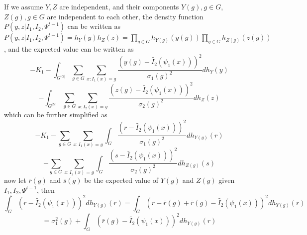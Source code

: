 \documentclass[11pt]{article}
\begin{document}
If we assume $Y, Z$ are independent, and their components $Y(g), g\in G$, $Z(g), g\in G$ are independent to each other, the density function $P(y,z| I_{1}, I_{2}, \Psi^{t-1})$ can be written as $P(y,z| I_{1}, I_{2}, \Psi^{t-1}) = h_{Y}(y)h_{Z}(z) = 
\prod_{g\in G}h_{Y(g)}(y(g)) \prod_{g\in G}h_{Z(g)}(z(g))$, and the expected value can be written as 
\begin{equation}
-K_{1}-\int_{G^{|G|}}\sum_{g\in G} \sum_{x : I_{1}(x) = g} \frac{\left(y(g) - \tilde{I_{2}}(\psi_{1}(x))\right)^{2}}{\sigma_{1}(g)^{2}}d h_{Y}(y) 
\end{equation}
\begin{equation}
-\int_{G^{|G|}}\sum_{g\in G} \sum_{x : I_{2}(x) = g} \frac{\left(z(g) - \tilde{I_{2}}(\psi_{1}(x))\right)^{2}}{\sigma_{2}(g)^{2}}d h_{Z}(z) 
\end{equation}
which can be further simplified as
\begin{equation}
-K_{1}-\sum_{g\in G} \sum_{x : I_{1}(x) = g} \int_{G}\frac{\left(r - \tilde{I_{2}}(\psi_{1}(x))\right)^{2}}{\sigma_{1}(g)^{2}}d h_{Y(g)}(r) 
\end{equation}
\begin{equation}
-\sum_{g\in G} \sum_{x : I_{2}(x) = g} \int_{G}\frac{\left(s - \tilde{I_{2}}(\psi_{1}(x))\right)^{2}}{\sigma_{2}(g)^{2}}d h_{Z(g)}(s) 
\end{equation}
now let $\bar{r}(g)$ and $\bar{s}(g)$ be the expected value of $Y(g)$ and $Z(g)$ given $I_{1}, I_{2}, \Psi^{t-1}$, then 
\begin{equation}
\int_{G}\left(r - \tilde{I_{2}}(\psi_{1}(x))\right)^{2}d h_{Y(g)}(r) = \int_{G}\left(r - \bar{r}(g) + \bar{r}(g) - \tilde{I_{2}}(\psi_{1}(x))\right)^{2}d h_{Y(g)}(r)
\end{equation}
\begin{equation}
=\sigma^{2}_{1}(g) + \int_{G}\left(\bar{r}(g) - \tilde{I_{2}}(\psi_{1}(x))\right)^{2}d h_{Y(g)}(r)
\end{equation}


\end{document}
